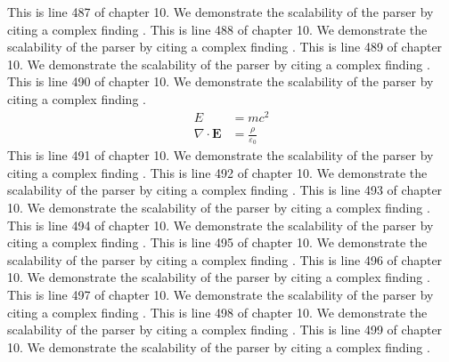 This is line 487 of chapter 10. We demonstrate the scalability of the parser by citing a complex finding \cite{ref10_487}.
This is line 488 of chapter 10. We demonstrate the scalability of the parser by citing a complex finding \cite{ref10_488}.
This is line 489 of chapter 10. We demonstrate the scalability of the parser by citing a complex finding \cite{ref10_489}.
This is line 490 of chapter 10. We demonstrate the scalability of the parser by citing a complex finding \cite{ref10_490}.
\begin{align*}
  E &= mc^2 \\
  \nabla \cdot \mathbf{E} &= \frac{\rho}{\varepsilon_0}
\end{align*}
This is line 491 of chapter 10. We demonstrate the scalability of the parser by citing a complex finding \cite{ref10_491}.
This is line 492 of chapter 10. We demonstrate the scalability of the parser by citing a complex finding \cite{ref10_492}.
This is line 493 of chapter 10. We demonstrate the scalability of the parser by citing a complex finding \cite{ref10_493}.
This is line 494 of chapter 10. We demonstrate the scalability of the parser by citing a complex finding \cite{ref10_494}.
This is line 495 of chapter 10. We demonstrate the scalability of the parser by citing a complex finding \cite{ref10_495}.
This is line 496 of chapter 10. We demonstrate the scalability of the parser by citing a complex finding \cite{ref10_496}.
This is line 497 of chapter 10. We demonstrate the scalability of the parser by citing a complex finding \cite{ref10_497}.
This is line 498 of chapter 10. We demonstrate the scalability of the parser by citing a complex finding \cite{ref10_498}.
This is line 499 of chapter 10. We demonstrate the scalability of the parser by citing a complex finding \cite{ref10_499}.
